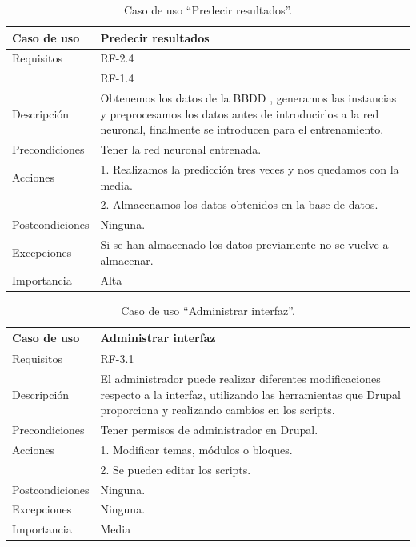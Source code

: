 \begin{table}
  \begin{center}
   \begin{tabular}{|p{3cm} | p{9cm} |}
    \hline
    Caso de uso & Predecir resultados\\
    \hline
    Requisitos & RF-2.4\\
	    & RF-1.4\\
    \hline
    Descripción & Obtenemos los datos de la BBDD , generamos las instancias y preprocesamos los datos antes de introducirlos a la red neuronal, finalmente se introducen para el entrenamiento.\\
    \hline
    Precondiciones &Tener la red neuronal entrenada.\\
    \hline
  	Acciones & 1. Realizamos la predicción tres veces y nos quedamos con la media.\\
    &2. Almacenamos los datos obtenidos en la base de datos.\\
    \hline
    Postcondiciones & Ninguna. \\
    \hline
    Excepciones & Si se han almacenado los datos previamente no se vuelve a almacenar.\\
    \hline
    Importancia & Alta\\
    \hline
   \end{tabular}
   \caption{Caso de uso ``Predecir resultados''.}
   \label{tabla:casoUso2.2}
  \end{center}
 \end{table} 
 
 \begin{table}
  \begin{center}
   \begin{tabular}{|p{3cm} | p{9cm} |}
    \hline
    Caso de uso & Administrar interfaz\\
    \hline
    Requisitos & RF-3.1\\
    \hline
    Descripción & El administrador puede realizar diferentes modificaciones respecto a la interfaz, utilizando las herramientas que Drupal proporciona y realizando cambios en los scripts.\\
    \hline
    Precondiciones &Tener permisos de administrador en Drupal.\\
    \hline
  	Acciones & 1. Modificar temas, módulos o bloques.\\
    &2. Se pueden editar los scripts.\\
    \hline
    Postcondiciones & Ninguna. \\
    \hline
    Excepciones & Ninguna.\\
    \hline
    Importancia & Media\\
    \hline
   \end{tabular}
   \caption{Caso de uso ``Administrar interfaz''.}
   \label{tabla:casoUso3.1}
  \end{center}
 \end{table} 
 
